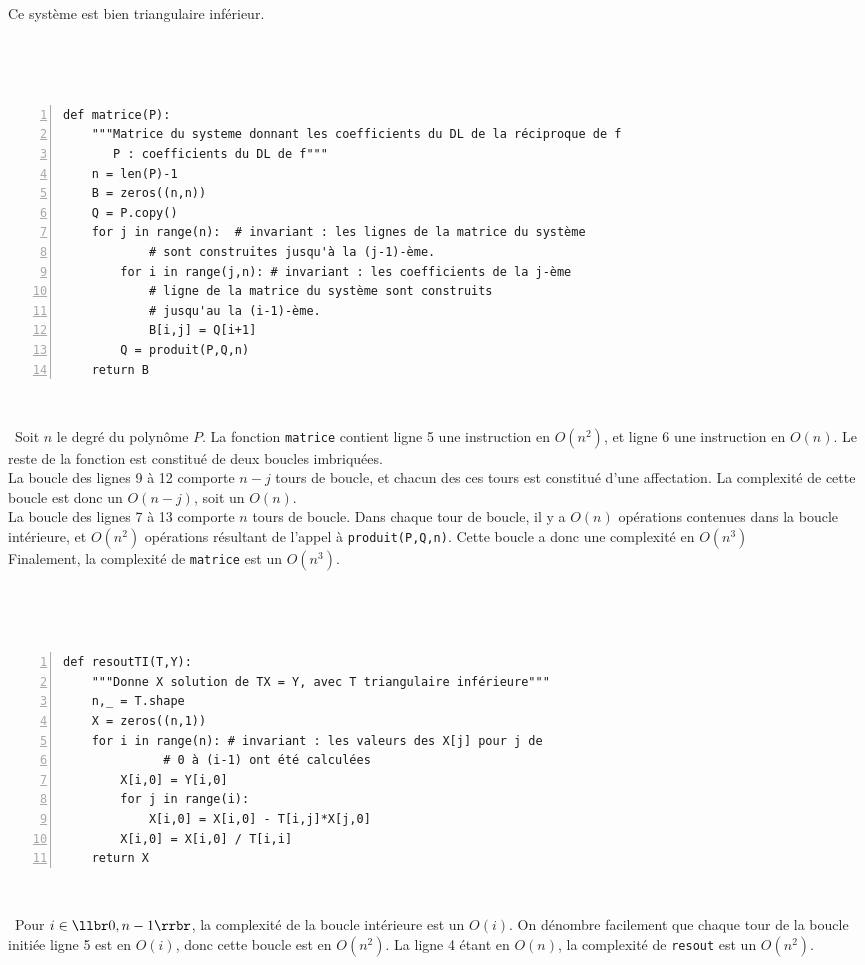 Ce système est bien triangulaire inférieur.

\medskip\

\question\ 
\begin{Verbatim}[gobble=0,numbers=left]
def matrice(P):
    """Matrice du systeme donnant les coefficients du DL de la réciproque de f
       P : coefficients du DL de f"""
    n = len(P)-1
    B = zeros((n,n))
    Q = P.copy()
    for j in range(n): 	# invariant : les lignes de la matrice du système 
			# sont construites jusqu'à la (j-1)-ème.
        for i in range(j,n): # invariant : les coefficients de la j-ème  
			# ligne de la matrice du système sont construits
			# jusqu'au la (i-1)-ème.
            B[i,j] = Q[i+1]
        Q = produit(P,Q,n)
    return B
\end{Verbatim}


\medskip\

\question\ Soit $n$ le degré du polynôme $P$. La fonction \texttt{matrice} contient ligne 5 une instruction en 
$O(n^2)$, et ligne 6 une instruction en $O(n)$. Le reste de la fonction est constitué de deux boucles imbriquées.\\
La boucle des lignes 9 à 12 comporte $n-j$ tours de boucle, et chacun des ces tours est constitué d'une affectation. 
La complexité de cette boucle est donc un $O(n-j)$, soit un $O(n)$.\\
La boucle des lignes 7 à 13 comporte $n$ tours de boucle. Dans chaque tour de boucle, il y a $O(n)$ opérations 
contenues dans la boucle intérieure, et $O(n^2)$ opérations résultant de l'appel à \texttt{produit(P,Q,n)}. Cette 
boucle a donc une complexité en $O(n^3)$\\
Finalement, la complexité de \texttt{matrice} est un $O(n^3)$.

\medskip\

\question\ 
\begin{Verbatim}[gobble=0,numbers=left]
def resoutTI(T,Y):
    """Donne X solution de TX = Y, avec T triangulaire inférieure"""
    n,_ = T.shape
    X = zeros((n,1))
    for i in range(n): # invariant : les valeurs des X[j] pour j de 
		      # 0 à (i-1) ont été calculées
        X[i,0] = Y[i,0]
        for j in range(i):
            X[i,0] = X[i,0] - T[i,j]*X[j,0]
        X[i,0] = X[i,0] / T[i,i]
    return X
\end{Verbatim}

\medskip\

\question\ Pour $i\in\llbr 0,n-1\rrbr$, la complexité de la boucle intérieure est un $O(i)$. On dénombre facilement que 
chaque tour de la boucle initiée ligne 5 est en $O(i)$, donc cette boucle est en $O(n^2)$. La ligne 4 étant en $O(n)$, 
la complexité de \texttt{resout} est un $O(n^2)$.


